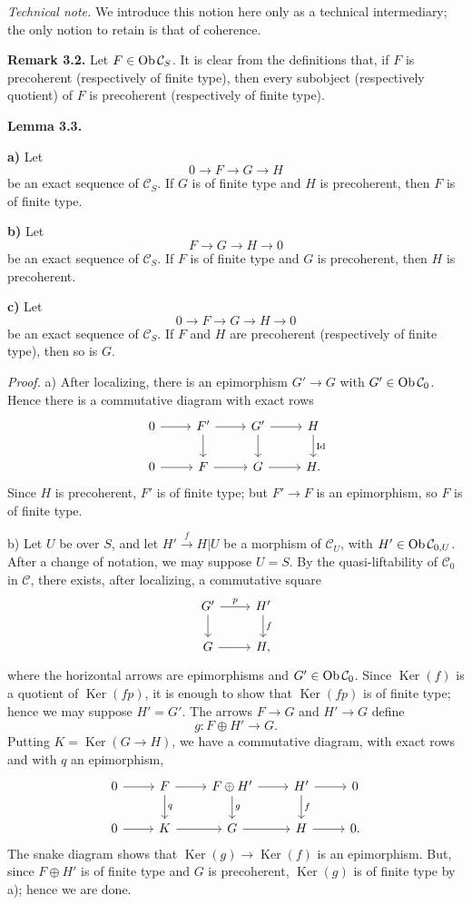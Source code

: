 \documentclass[11pt]{article}
\providecommand{\Ker}{\operatorname{Ker}}
\begin{document}
\emph{Technical note.} We introduce this notion here only as a technical intermediary; the only notion to retain is that of coherence.

\textbf{Remark 3.2.} Let \(F\in\operatorname{Ob}\mathcal C_S\). It is clear from the definitions that, if \(F\) is precoherent (respectively of finite type), then every subobject (respectively quotient) of \(F\) is precoherent (respectively of finite type).

\textbf{Lemma 3.3.}

\textbf{a)} Let
\[
  0\longrightarrow F\longrightarrow G\longrightarrow H
\]
be an exact sequence of \(\mathcal C_S\). If \(G\) is of finite type and \(H\) is precoherent, then \(F\) is of finite type.

\textbf{b)} Let
\[
  F\longrightarrow G\longrightarrow H\longrightarrow 0
\]
be an exact sequence of \(\mathcal C_S\). If \(F\) is of finite type and \(G\) is precoherent, then \(H\) is precoherent.

\textbf{c)} Let
\[
  0\longrightarrow F\longrightarrow G\longrightarrow H\longrightarrow 0
\]
be an exact sequence of \(\mathcal C_S\). If \(F\) and \(H\) are precoherent (respectively of finite type), then so is \(G\).

\emph{Proof.} a) After localizing, there is an epimorphism \(G'\to G\) with \(G'\in\operatorname{Ob}\mathcal C_0\). Hence there is a commutative diagram with exact rows
\[
\begin{tikzcd}
0\arrow[r]&F'\arrow[r]\arrow[d]&G'\arrow[r]\arrow[d]&H\arrow[d,"\Id"]\\
0\arrow[r]&F\arrow[r]&G\arrow[r]&H .
\end{tikzcd}
\]
Since \(H\) is precoherent, \(F'\) is of finite type; but \(F'\to F\) is an epimorphism, so \(F\) is of finite type.

b) Let \(U\) be over \(S\), and let \(H'\xrightarrow{f}H|U\) be a morphism of \(\mathcal C_U\), with \(H'\in\operatorname{Ob}\mathcal C_{0,U}\). After a change of notation, we may suppose \(U=S\). By the quasi-liftability of \(\mathcal C_0\) in \(\mathcal C\), there exists, after localizing, a commutative square
\[
\begin{tikzcd}
G' \arrow[r,"p"] \arrow[d] & H' \arrow[d,"f"]\\
G \arrow[r] & H,
\end{tikzcd}
\]
where the horizontal arrows are epimorphisms and \(G'\in\operatorname{Ob}\mathcal C_0\). Since \(\Ker(f)\) is a quotient of \(\Ker(fp)\), it is enough to show that \(\Ker(fp)\) is of finite type; hence we may suppose \(H'=G'\). The arrows \(F\to G\) and \(H'\to G\) define
\[
  g:F\oplus H'\longrightarrow G.
\]
Putting \(K=\Ker(G\to H)\), we have a commutative diagram, with exact rows and with \(q\) an epimorphism,
\[
\begin{tikzcd}
0\arrow[r]&F\arrow[r]\arrow[d,"q"]&F\oplus H'\arrow[r]\arrow[d,"g"]&H'\arrow[r]\arrow[d,"f"]&0\\
0\arrow[r]&K\arrow[r]&G\arrow[r]&H\arrow[r]&0 .
\end{tikzcd}
\]
The snake diagram shows that \(\Ker(g)\to\Ker(f)\) is an epimorphism. But, since \(F\oplus H'\) is of finite type and \(G\) is precoherent, \(\Ker(g)\) is of finite type by a); hence we are done.
\end{document}
